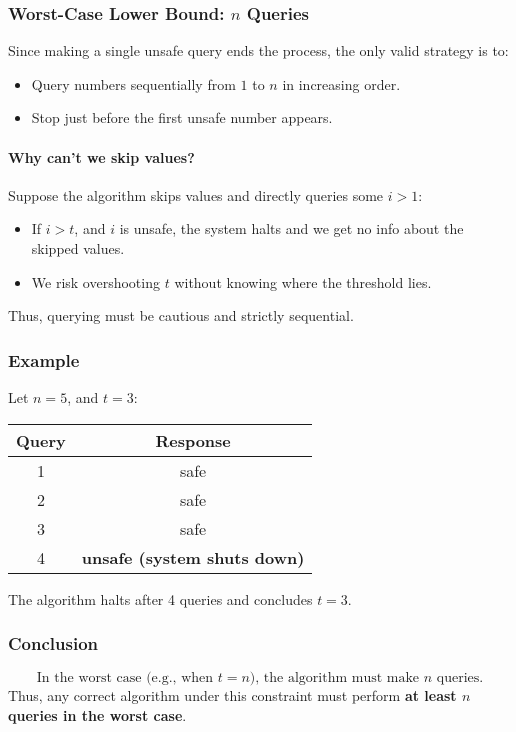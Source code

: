 \documentclass[12pt]{article}
\begin{document}
	\subsubsection*{Worst-Case Lower Bound: $n$ Queries}
	Since making a single unsafe query ends the process, the only valid strategy is to:
	\begin{itemize}
		\item Query numbers sequentially from $1$ to $n$ in increasing order.
		\item Stop just before the first unsafe number appears.
	\end{itemize}
	
	\paragraph{Why can’t we skip values?}
	Suppose the algorithm skips values and directly queries some $i > 1$:
	\begin{itemize}
		\item If $i > t$, and $i$ is unsafe, the system halts and we get no info about the skipped values.
		\item We risk overshooting $t$ without knowing where the threshold lies.
	\end{itemize}
	Thus, querying must be cautious and strictly sequential.
	
	\subsubsection*{Example}
	Let $n = 5$, and $t = 3$:
	\begin{center}
		\begin{tabular}{c|c}
			Query & Response \\
			\hline
			1     & safe     \\
			2     & safe     \\
			3     & safe     \\
			4     & \textbf{unsafe (system shuts down)} \\
		\end{tabular}
	\end{center}
	
	The algorithm halts after 4 queries and concludes $t = 3$.
	
	\subsubsection*{Conclusion}
	\[
	\boxed{
		\text{In the worst case (e.g., when } t = n \text{), the algorithm must make } n \text{ queries.}
	}
	\]
	Thus, any correct algorithm under this constraint must perform \textbf{at least $n$ queries in the worst case}.
	
\end{document}
